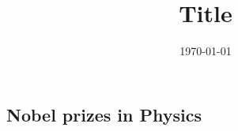 \documentclass[12pt, a4paper, oneside]{article}
\title{Title}
\date{\today}
\author{}
\begin{document}
\begin{spacing}{2.0}
\maketitle


\section{Nobel prizes in Physics}

\end{spacing}{}



\end{document}
